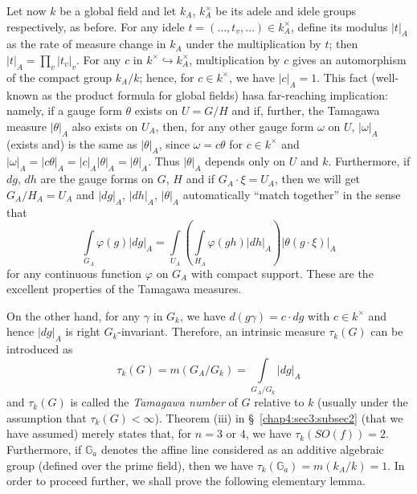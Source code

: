 Let now $k$ be a global field and let $k_{A}$, $k^{\times}_{A}$ be its
adele and idele groups respectively, as before. For any idele
$t=(\ldots,t_{v},\ldots)\in k^{\times}_{A}$, define its modulus
$|t|_{A}$ as the rate of measure change in $k_{A}$ under the
multiplication by $t$; then $|t|_{A}=\prod\limits_{v}|t_{v}|_{v}$. For
any $c$ in $k^{\times}\hookrightarrow k^{\times}_{A}$, multiplication by
$c$ gives an automorphism of the compact group $k_{A}/k$; hence, for
$c\in k^{\times}$, we have $|c|_{A}=1$. This fact (well-known as the
product formula for global fields) has\pageoriginale a far-reaching
implication: namely, if a gauge form $\theta$ exists on $U=G/H$ and
if, further, the Tamagawa measure $|\theta|_{A}$ also exists on
$U_{A}$, then, for any other gauge form $\omega$ on $U$,
$|\omega|_{A}$ (exists and) is the same as $|\theta|_{A}$, since
$\omega=c\theta$ for $c\in k^{\times}$ and
$|\omega|_{A}=|c\theta|_{A}=|c|_{A}|\theta|_{A}=|\theta|_{A}$. Thus
$|\theta|_{A}$ depends only on $U$ and $k$. Furthermore, if $dg$, $dh$
are the gauge forms on $G$, $H$ and if $G_{A}\cdot \xi=U_{A}$, then we
will get $G_{A}/H_{A}=U_{A}$ and $|dg|_{A}$, $|dh|_{A}$,
$|\theta|_{A}$ automatically ``match together'' in the sense that
\begin{equation*}
  \int\limits_{G_{A}}\varphi(g)|dg|_{A}=\int\limits_{U_{A}}
  \left(\int\limits_{H_{A}}\varphi(gh)|dh|_{A}\right)
  |\theta(g\cdot\xi)|_{A}\tag{118}\label{chap4:sec3:subsec3:eq118} 
\end{equation*}
for any continuous function $\varphi$ on $G_{A}$ with compact
support. These are the excellent properties of the Tamagawa measures.

On the other hand, for any $\gamma$ in $G_{k}$, we have
$d(g\gamma)=c\cdot dg$ with $c\in k^{\times}$ and hence $|dg|_{A}$ is
right $G_{k}$-invariant. Therefore, an intrinsic measure $\tau_{k}(G)$
can be introduced as
$$
\tau_{k}(G)=m(G_{A}/G_{k})=\int\limits_{G_{A}/G_{k}}|dg|_{A}
$$
and $\tau_{k}(G)$ is called the {\em Tamagawa number} of $G$ relative
to $k$ (usually under the assumption that
$\tau_{k}(G)<\infty$). Theorem (iii) in \S\ \ref{chap4:sec3:subsec2}
(that we have 
assumed) merely states that, for $n=3$ or $4$, we have
$\tau_{k}(SO(f))=2$. Furthermore, if $\mathbb{G}_{a}$ denotes the
affine line considered as an additive algebraic group (defined over
the prime field), then we have
$\tau_{k}(\mathbb{G}_{a})=m(k_{A}/k)=1$. In order to proceed further,
we shall prove the following elementary lemma.


